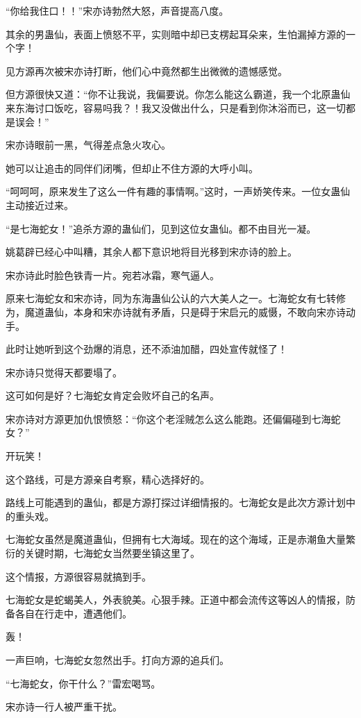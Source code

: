 \begin{this_body}
“你给我住口！！”宋亦诗勃然大怒，声音提高八度。

其余的男蛊仙，表面上愤怒不平，实则暗中却已支楞起耳朵来，生怕漏掉方源的一个字！

见方源再次被宋亦诗打断，他们心中竟然都生出微微的遗憾感觉。

但方源很快又道：“你不让我说，我偏要说。你怎么能这么霸道，我一个北原蛊仙来东海讨口饭吃，容易吗我？！我又没做出什么，只是看到你沐浴而已，这一切都是误会！”

宋亦诗眼前一黑，气得差点急火攻心。

她可以让追击的同伴们闭嘴，但却止不住方源的大呼小叫。

“呵呵呵，原来发生了这么一件有趣的事情啊。”这时，一声娇笑传来。一位女蛊仙主动接近过来。

“是七海蛇女！”追杀方源的蛊仙们，见到这位女蛊仙。都不由目光一凝。

姚葛辟已经心中叫糟，其余人都下意识地将目光移到宋亦诗的脸上。

宋亦诗此时脸色铁青一片。宛若冰霜，寒气逼人。

原来七海蛇女和宋亦诗，同为东海蛊仙公认的六大美人之一。七海蛇女有七转修为，魔道蛊仙，本身和宋亦诗就有矛盾，只是碍于宋启元的威慑，不敢向宋亦诗动手。

此时让她听到这个劲爆的消息，还不添油加醋，四处宣传就怪了！

宋亦诗只觉得天都要塌了。

这可如何是好？七海蛇女肯定会败坏自己的名声。

宋亦诗对方源更加仇恨愤怒：“你这个老淫贼怎么这么能跑。还偏偏碰到七海蛇女？”

开玩笑！

这个路线，可是方源亲自考察，精心选择好的。

路线上可能遇到的蛊仙，都是方源打探过详细情报的。七海蛇女是此次方源计划中的重头戏。

七海蛇女虽然是魔道蛊仙，但拥有七大海域。现在的这个海域，正是赤潮鱼大量繁衍的关键时期，七海蛇女当然要坐镇这里了。

这个情报，方源很容易就搞到手。

七海蛇女是蛇蝎美人，外表貌美。心狠手辣。正道中都会流传这等凶人的情报，防备各自在行走中，遭遇他们。

轰！

一声巨响，七海蛇女忽然出手。打向方源的追兵们。

“七海蛇女，你干什么？”雷宏喝骂。

宋亦诗一行人被严重干扰。


\end{this_body}
